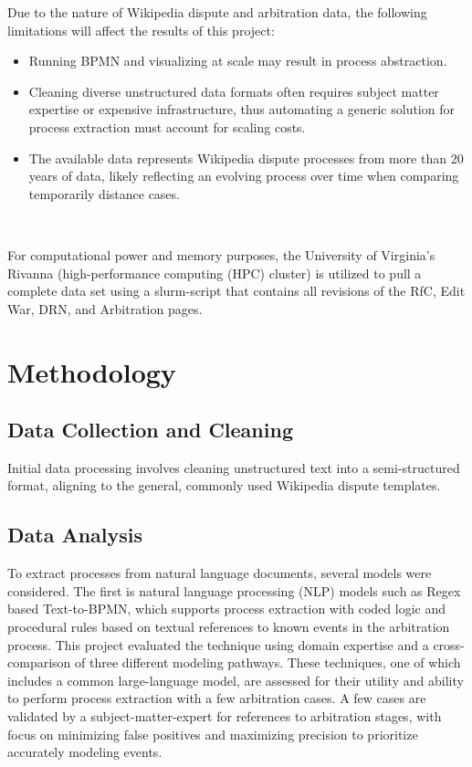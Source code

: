 \documentclass[conference]{IEEEtran}
\begin{document}
Due to the nature of Wikipedia dispute and arbitration data, the following limitations will affect the results of this project:
\begin{itemize}
    \item Running BPMN and visualizing at scale may result in process abstraction.
    \item Cleaning diverse unstructured data formats often requires subject matter expertise or expensive infrastructure, thus automating a generic solution for process extraction must account for scaling costs.
    \item The available data represents Wikipedia dispute processes from more than 20 years of data, likely reflecting an evolving process over time when comparing temporarily distance cases.
\end{itemize}\

For computational power and memory purposes, the University of Virginia’s Rivanna (high-performance computing (HPC) cluster) is utilized to pull a complete data set using a slurm-script that contains all revisions of the RfC, Edit War, DRN, and Arbitration pages.


\section{Methodology}

\subsection{Data Collection and Cleaning}
Initial data processing involves cleaning unstructured text into a semi-structured format, aligning to the general, commonly used Wikipedia dispute templates.

\subsection{Data Analysis}
To extract processes from natural language documents, several models were considered. The first is natural language processing (NLP) models such as Regex based Text-to-BPMN, which supports process extraction with coded logic and procedural rules based on textual references to known events in the arbitration process. This project evaluated the technique using domain expertise and a cross-comparison of three different modeling pathways. These techniques, one of which includes a common large-language model, are assessed for their utility and ability to perform process extraction with a few arbitration cases. A few cases are validated by a subject-matter-expert for references to arbitration stages, with focus on minimizing false positives and maximizing precision to prioritize accurately modeling events.
\end{document}
